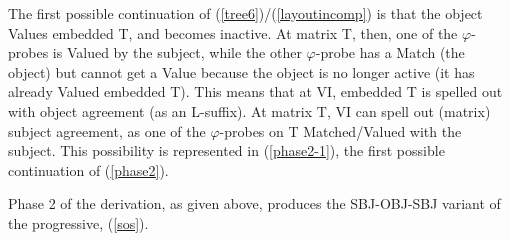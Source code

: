 \documentclass[output=paper
,modfonts
,nonflat]{langsci/langscibook}
\begin{document}
The first possible continuation of (\ref{tree6})/(\ref{layoutincomp}) is that the object Values embedded T, and becomes inactive. At matrix T, then, one of the $\varphi$-probes is Valued by the subject, while the other $\varphi$-probe has a Match (the object) but cannot get a Value because the object is no longer active (it has already Valued embedded T). This means that at VI, embedded T is spelled out with object agreement (as an L-suffix). At matrix T, VI can spell out (matrix) subject agreement, as one of the $\varphi$-probes on T Matched/Valued with the subject. This possibility is represented in (\ref{phase2-1}), the first possible continuation of (\ref{phase2}).


\noindent Phase 2 of the derivation, as given above, produces the SBJ-OBJ-SBJ variant of the progressive, (\ref{sos}).
\end{document}
